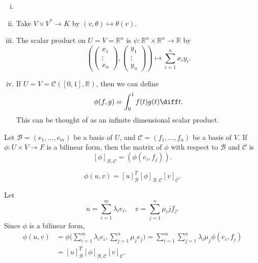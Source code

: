 \documentclass[12pt]{article}
\begin{document}
\begin{exbox}
	\begin{enumerate}[(i)]
		\item[]
		\item Take $V \times V^{\ast} \to K$ by $(v, \theta) \mapsto \theta(v)$.
		\item The scalar product on $U = V = \mathbb{R}^{n}$ is $\psi : \mathbb{R}^{n} \times \mathbb{R}^{n} \to \mathbb{R}$ by
			\[
				\left(
					\begin{pmatrix}
						x_1 \\
						\vdots \\
						x_n
					\end{pmatrix},
					\begin{pmatrix}
						y_1 \\
						\vdots \\
						y_n
					\end{pmatrix}
				\right)
				\mapsto  \sum_{i = 1}^{n} x_i y_i
			.\]
		\item If $U = V = \mathcal{C}([0, 1], \mathbb{R})$, then we can define
			\[
				\phi(f, g) = \int_{0}^{1}f(t)g(t) \diff t
			.\]
			This can be thought of as an infinite dimensional scalar product.
	\end{enumerate}
\end{exbox}

\begin{definition}
	Let $\mathcal{B} = (e_1, \ldots, e_m)$ be a basis of $U$, and $\mathcal{C} = (f_1, \ldots, f_n)$ be a basis of $V$. If $\phi : U \times V \to F$ is a bilinear form, then the matrix of $\phi$ with respect to $\mathcal{B}$ and $\mathcal{C}$ is
	\[
		[\phi]_{\mathcal{B}, \mathcal{C}} = (\phi(e_i, f_j))
	.\]
\end{definition}

\begin{lemma}
	\[
		\phi(u, v) = [u]_{\mathcal{B}}^{T} [\phi]_{\mathcal{B}, \mathcal{C}} [v]_{\mathcal{C}}
	.\]
\end{lemma}

\begin{proofbox}
	Let
\[
u = \sum_{i = 1}^{m} \lambda_i e_i, \quad v = \sum_{j = 1}^{n} \mu_ij f_j
.\]
Since $\phi$ is a bilinear form,
\begin{align*}
	\phi(u, v) &= \phi \Biggl( \sum_{i = 1}^{m} \lambda_i e_i, \sum_{j = 1}^{n} \mu_j e_j \Biggr) = \sum_{i = 1}^{m}\sum_{j = 1}^{n} \lambda_i \mu_j \phi(e_i, f_j) \\
		   &= [u]_{\mathcal{B}}^{T}[\phi]_{\mathcal{B}, \mathcal{C}}[v]_{\mathcal{C}}.
\end{align*}
\end{proofbox}
\end{document}
